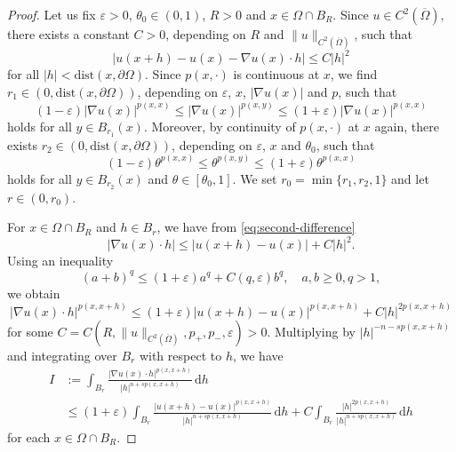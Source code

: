 \documentclass[11pt]{amsart}
\theoremstyle{plain}
\theoremstyle{definition}
\numberwithin{equation}{section}
\begin{document}
\begin{proof}
Let us fix $\varepsilon > 0$, $\theta_{0} \in (0,1)$, $R > 0$ and $x \in \Omega \cap B_{R}$. Since $u \in C^{2}(\overline{\Omega})$, there exists a constant $C > 0$, depending on $R$ and $\|u\|_{C^{2}(\overline{\Omega})}$, such that
\begin{equation} \label{eq:second-difference}
|u(x+h)-u(x)-\nabla u(x) \cdot h| \leq C |h|^{2}
\end{equation}
for all $|h| < \mathrm{dist}(x, \partial \Omega)$. Since $p(x, \cdot)$ is continuous at $x$, we find $r_{1} \in (0, \mathrm{dist}(x, \partial \Omega))$, depending on $\varepsilon$, $x$, $|\nabla u(x)|$ and $p$, such that
\begin{equation} \label{eq:r1}
(1-\varepsilon) |\nabla u(x)|^{p(x, x)} \leq |\nabla u(x)|^{p(x, y)} \leq (1+\varepsilon) |\nabla u(x)|^{p(x, x)}
\end{equation}
holds for all $y \in B_{r_{1}}(x)$. Moreover, by continuity of $p(x, \cdot)$ at $x$ again, there exists $r_{2} \in (0, \mathrm{dist}(x, \partial \Omega))$, depending on $\varepsilon$, $x$ and $\theta_0$, such that
\begin{equation} \label{eq:r2}
(1-\varepsilon) \theta^{p(x, x)} \leq \theta^{p(x, y)} \leq (1+ \varepsilon) \theta^{p(x, x)}
\end{equation}
holds for all $y \in B_{r_{2}}(x)$ and $\theta \in [\theta_{0}, 1]$. We set $r_{0} = \min\lbrace r_{1}, r_{2}, 1 \rbrace$ and let $r \in (0, r_{0})$.

For $x \in \Omega \cap B_{R}$ and $h \in B_{r}$, we have from \eqref{eq:second-difference}
\begin{equation*}
|\nabla u(x) \cdot h| \leq |u(x+h)-u(x)| + C |h|^2.
\end{equation*}
Using an inequality
\begin{equation} \label{eq:alg-ineq}
(a+b)^{q} \leq (1+\varepsilon)a^{q} + C(q, \varepsilon) b^{q}, \quad a, b \geq 0, q > 1,
\end{equation}
we obtain
\begin{equation*}
|\nabla u(x) \cdot h|^{p(x, x+h)} \leq (1+\varepsilon) |u(x+h)-u(x)|^{p(x, x+h)} + C |h|^{2p(x, x+h)}
\end{equation*}
for some $C = C(R, \|u\|_{C^{2}(\overline{\Omega})}, p_{+}, p_{-}, \varepsilon) > 0$. Multiplying by $|h|^{-n-sp(x, x+h)}$ and integrating over $B_{r}$ with respect to $h$, we have
\begin{equation} \label{eq:liminf-I}
\begin{split}
I
&:= \int_{B_{r}} \frac{|\nabla u(x) \cdot h|^{p(x, x+h)}}{|h|^{n+sp(x,x+h)}} \,\mathrm{d}h \\
&\leq (1+\varepsilon) \int_{B_{r}} \frac{|u(x+h)-u(x)|^{p(x, x+h)}}{|h|^{n+sp(x, x+h)}} \,\mathrm{d}h + C \int_{B_{r}} \frac{|h|^{2p(x, x+h)}}{|h|^{n+sp(x, x+h)}} \,\mathrm{d}h
\end{split}
\end{equation}
for each $x \in \Omega \cap B_{R}$.


\end{proof}
\end{document}

